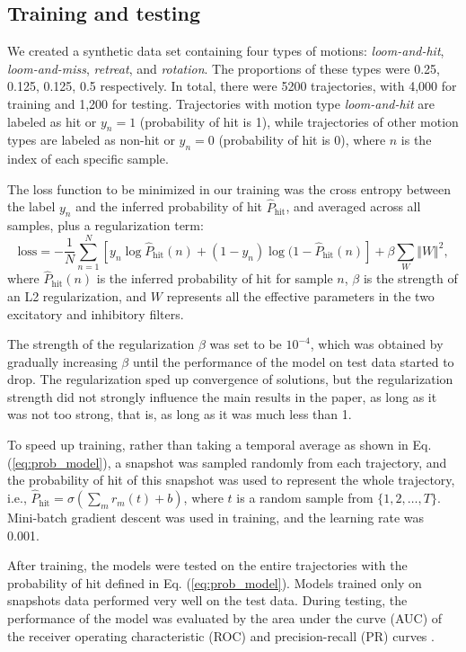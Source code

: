 \documentclass[pdftex,9pt,lineno]{elife}
\let\hat\widehat
\begin{document}
\subsection{Training and testing}
We created a synthetic data set containing four types of motions: \emph{loom-and-hit}, \emph{loom-and-miss}, \emph{retreat}, and \emph{rotation}. The proportions of these types were 0.25, 0.125, 0.125, 0.5 respectively. In total, there were 5200 trajectories, with 4,000 for training and 1,200 for testing. Trajectories with motion type \emph{loom-and-hit} are labeled as hit or $y_{n}=1$ (probability of hit is 1), while trajectories of other motion types are labeled as non-hit or $y_{n}=0$ (probability of hit is 0), where $n$ is the index of each specific sample.

The loss function to be minimized in our training was the cross entropy between the label $y_{n}$ and the inferred probability of hit $\hat{P}_{\text{hit}}$, and averaged across all samples, plus a regularization term:
\begin{equation}
\text{loss}=-\frac{1}{N}\sum_{n=1}^{N}\left[ y_{n}\log \hat{P}_{\text{hit}}(n)+(1-y_{n})\log (1-\hat{P}_{\text{hit}}(n) \right]+\beta\sum_{W}\Vert W \Vert^{2},
\end{equation}
where $\hat{P}_{\text{hit}}(n)$ is the inferred probability of hit for sample $n$, $\beta$ is the strength of an L2 regularization, and $W$ represents all the effective parameters in the two excitatory and inhibitory filters.

The strength of the regularization $\beta$ was set to be $10^{-4}$, which was obtained by gradually increasing $\beta$ until the performance of the model on test data started to drop. The regularization sped up convergence of solutions, but the regularization strength did not strongly influence the main results in the paper, as long as it was not too strong, that is, as long as it was much less than 1.

To speed up training, rather than taking a temporal average as shown in Eq. (\ref{eq:prob_model}), a snapshot was sampled randomly from each trajectory, and the probability of hit of this snapshot was used to represent the whole trajectory, i.e., $\hat{P}_{\text{hit}}=\sigma \left( \sum_{m}r_{m}(t)+b \right)$, where $t$ is a random sample from $\{1,2,\dots,T\}$. Mini-batch gradient descent was used in training, and the learning rate was 0.001.

After training, the models were tested on the entire trajectories with the probability of hit defined in Eq. (\ref{eq:prob_model}). Models trained only on snapshots data performed very well on the test data. During testing, the performance of the model was evaluated by the area under the curve (AUC) of the receiver operating characteristic (ROC) and precision-recall (PR) curves \citep{hanley1982meaning,davis2006relationship}.
\end{document}
